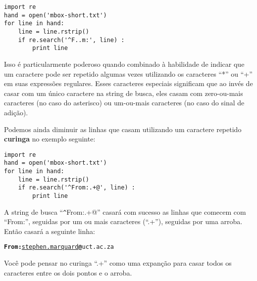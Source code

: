\beforeverb
\begin{verbatim}
import re
hand = open('mbox-short.txt')
for line in hand:
    line = line.rstrip()
    if re.search('^F..m:', line) :
        print line
\end{verbatim}
\afterverb
%

Isso é particularmente poderoso quando combinado à habilidade de indicar que um caractere pode
ser repetido algumas vezes utilizando os caracteres ``*'' ou ``+'' em suas expressões regulares.
Esses caracteres especiais significam que ao invés de casar com um único caractere na string de
busca, eles casam com zero-ou-mais caracteres (no caso do asterisco) ou um-ou-mais caracteres 
(no caso do sinal de adição).

Podemos ainda diminuir as linhas que casam utilizando um caractere repetido {\bf curinga} no 
exemplo seguinte: 

\beforeverb
\begin{verbatim}
import re
hand = open('mbox-short.txt')
for line in hand:
    line = line.rstrip()
    if re.search('^From:.+@', line) :
        print line
\end{verbatim}
\afterverb
%

A string de busca ``\verb"^"From:.+@'' casará com sucesso as linhas que comecem com ``From:'',
seguidas por um ou mais caracteres (``.+''), seguidas por uma arroba. Então casará a seguinte
linha:

\beforeverb
\begin{alltt}
{\bf From:}\underline{ stephen.marquard}{\bf @}uct.ac.za
\end{alltt}
\afterverb

Você pode pensar no curinga ``.+'' como uma expanção para casar todos os caracteres entre os 
dois pontos e o arroba. 

